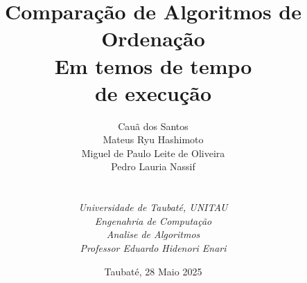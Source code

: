 
\def\Company{Universidade de Taubaté}
\def\Institute{\textit{Universidade de Taubaté, UNITAU}}
\def\Course{\textit{Engenahria de Computação}}
\def\Module{\textit{Analise de Algoritmos}}
\def\Docent{\textit{Professor Eduardo Hidenori Enari}}
\def\Assistant{\textit{}}

\def\BoldTitle{Comparação de Algoritmos de Ordenação}

\def\Subtitle{Em temos de tempo \\ de execução \\}
\def\Authors{Cauã dos Santos \\ Mateus Ryu Hashimoto \\ Miguel de Paulo Leite de Oliveira \\ Pedro Lauria Nassif } 
\def\Shortname{}

\title{\textbf{\BoldTitle}\\\Subtitle}
\author{\Authors \\ \\ \\ \Institute\\ \Course\\ \Module\\ \Docent\\ \Assistant}
\date{Taubaté, 28 Maio 2025}

